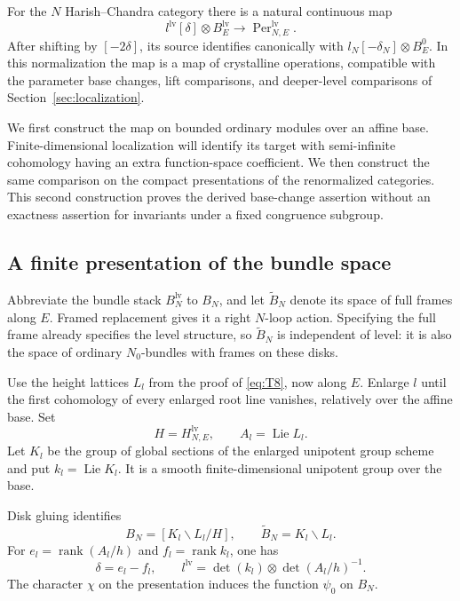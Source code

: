 \begin{proposition}\label{prop:unipotent-period}
For the $N$ Harish--Chandra category there is a natural continuous map
\begin{equation}\label{eq:T10}
 l^{\mathrm{lv}}[\delta]\otimes B_E^{\mathrm{lv}}
       \longrightarrow \operatorname{Per}_{N,E}^{\mathrm{lv}}.
\end{equation}
After shifting by $[-2\delta]$, its source identifies canonically with
$l_N[-\delta_N]\otimes B_E^0$.  In this normalization the map is a
map of crystalline operations, compatible with the parameter base
changes, lift comparisons, and deeper-level comparisons of
Section~\ref{sec:localization}.
\end{proposition}

We first construct the map on bounded ordinary modules over an affine
base.  Finite-dimensional localization will identify its target with
semi-infinite cohomology having an extra function-space coefficient.
We then construct the same comparison on the compact presentations of
the renormalized categories.  This second construction proves the
derived base-change assertion without an exactness assertion for
invariants under a fixed congruence subgroup.

\subsection{A finite presentation of the bundle space}

Abbreviate the bundle stack $B_N^{\mathrm{lv}}$ to $B_N$, and let
$\widetilde B_N$ denote its space of full frames along $E$.  Framed
replacement gives it a right $N$-loop action.  Specifying the full
frame already specifies the level structure, so $\widetilde B_N$ is
independent of level: it is also the space of ordinary $N_0$-bundles
with frames on these disks.

Use the height lattices $L_l$ from the proof of \eqref{eq:T8}, now
along $E$.  Enlarge $l$ until the first cohomology of every enlarged
root line vanishes, relatively over the affine base.  Set
\[
 H=H_{N,E}^{\mathrm{lv}},\qquad
 A_l=\operatorname{Lie}L_l.
\]
Let $K_l$ be the group of global sections of the enlarged unipotent
group scheme and put $k_l=\operatorname{Lie}K_l$.  It is a smooth
finite-dimensional unipotent group over the base.

\begin{lemma}\label{lem:unipotent-presentation}
Disk gluing identifies
\begin{equation}\label{eq:T11}
 B_N=[K_l\backslash L_l/H],\qquad
 \widetilde B_N=K_l\backslash L_l.
\end{equation}
For $e_l=\operatorname{rank}(A_l/h)$ and
$f_l=\operatorname{rank}k_l$, one has
\begin{equation}\label{eq:T12}
 \delta=e_l-f_l,\qquad
 l^{\mathrm{lv}}=\det(k_l)\otimes\det(A_l/h)^{-1}.
\end{equation}
The character $\chi$ on the presentation induces the function
$\psi_0$ on $B_N$.
\end{lemma}

